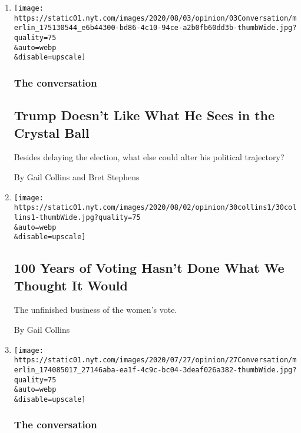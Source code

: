 \begin{enumerate}
\def\labelenumi{\arabic{enumi}.}
\item
  \href{/2020/08/03/opinion/trump-biden-2020.html}{}

  \texttt{[image: https://static01.nyt.com/images/2020/08/03/opinion/03Conversation/merlin\_175130544\_e6b44300-bd86-4c10-94ce-a2b0fb60dd3b-thumbWide.jpg?quality=75\\\&auto=webp\\\&disable=upscale]}

  \hypertarget{the-conversation}{%
  \subsubsection{The conversation}\label{the-conversation}}

  \hypertarget{trump-doesnt-like-what-he-sees-in-the-crystal-ball}{%
  \subsection{Trump Doesn't Like What He Sees in the Crystal
  Ball}\label{trump-doesnt-like-what-he-sees-in-the-crystal-ball}}

  Besides delaying the election, what else could alter his political
  trajectory?

  By Gail Collins and Bret Stephens
\item
  \href{/2020/07/30/opinion/sunday/19th-amendment-women-suffrage.html}{}

  \texttt{[image: https://static01.nyt.com/images/2020/08/02/opinion/30collins1/30collins1-thumbWide.jpg?quality=75\\\&auto=webp\\\&disable=upscale]}

  \hypertarget{100-years-of-voting-hasnt-done-what-we-thought-it-would}{%
  \subsection{100 Years of Voting Hasn't Done What We Thought It
  Would}\label{100-years-of-voting-hasnt-done-what-we-thought-it-would}}

  The unfinished business of the women's vote.

  By Gail Collins
\item
  \href{/2020/07/27/opinion/biden-trump-2020-vp.html}{}

  \texttt{[image: https://static01.nyt.com/images/2020/07/27/opinion/27Conversation/merlin\_174085017\_27146aba-ea1f-4c9c-bc04-3deaf026a382-thumbWide.jpg?quality=75\\\&auto=webp\\\&disable=upscale]}

  \hypertarget{the-conversation-1}{%
  \subsubsection{The conversation}\label{the-conversation-1}}


\end{enumerate}
